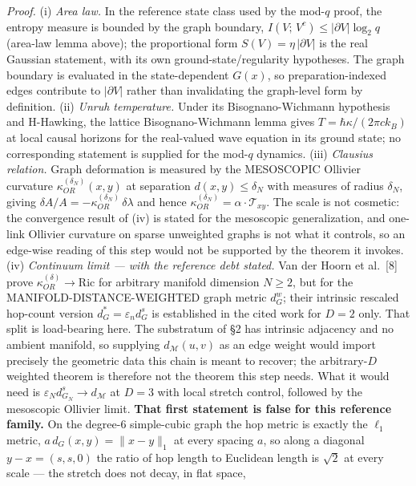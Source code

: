 \documentclass[
]{article}
\begin{document}
\emph{Proof.} (i) \emph{Area law.} In the reference state class used by
the mod-\(q\) proof, the entropy measure is bounded by the graph
boundary, \(I(V;\,V^c)\le|\partial V|\log_2 q\) (area-law lemma above);
the proportional form \(S(V)=\eta\,|\partial V|\) is the real Gaussian
statement, with its own ground-state/regularity hypotheses. The graph
boundary is evaluated in the state-dependent \(G(x)\), so
preparation-indexed edges contribute to \(|\partial V|\) rather than
invalidating the graph-level form by definition. (ii) \emph{Unruh
temperature.} Under its Bisognano-Wichmann hypothesis and H-Hawking, the
lattice Bisognano-Wichmann lemma gives \(T=\hbar\kappa/(2\pi c k_B)\) at
local causal horizons for the real-valued wave equation in its ground
state; no corresponding statement is supplied for the mod-\(q\)
dynamics. (iii) \emph{Clausius relation.} Graph deformation is measured
by the MESOSCOPIC Ollivier curvature \(\kappa^{(\delta_N)}_{OR}(x,y)\)
at separation \(d(x,y)\le\delta_N\) with measures of radius
\(\delta_N\), giving
\(\delta A/A=-\kappa^{(\delta_N)}_{OR}\,\delta\lambda\) and hence
\(\kappa^{(\delta_N)}_{OR}=\alpha\cdot\mathcal{T}_{xy}\). The scale is
not cosmetic: the convergence result of (iv) is stated for the
mesoscopic generalization, and one-link Ollivier curvature on sparse
unweighted graphs is not what it controls, so an edge-wise reading of
this step would not be supported by the theorem it invokes. (iv)
\emph{Continuum limit --- with the reference debt stated.} Van der Hoorn
et al.~{[}8{]} prove \(\kappa^{(\delta)}_{OR}\to\mathrm{Ric}\) for
arbitrary manifold dimension \(N\ge2\), but for the
MANIFOLD-DISTANCE-WEIGHTED graph metric \(d_G^w\); their intrinsic
rescaled hop-count version \(d_G^*=\varepsilon_n d_G^s\) is established
in the cited work for \(D=2\) only. That split is load-bearing here. The
substratum of §2 has intrinsic adjacency and no ambient manifold, so
supplying \(d_{\mathcal M}(u,v)\) as an edge weight would import
precisely the geometric data this chain is meant to recover; the
arbitrary-\(D\) weighted theorem is therefore not the theorem this step
needs. What it would need is
\(\varepsilon_N d^s_{G_N}\to d_{\mathcal M}\) at \(D=3\) with local
stretch control, followed by the mesoscopic Ollivier limit. \textbf{That
first statement is false for this reference family.} On the degree-\(6\)
simple-cubic graph the hop metric is exactly the \(\ell_1\) metric,
\(a\,d_G(x,y)=\|x-y\|_1\) at every spacing \(a\), so along a diagonal
\(y-x=(s,s,0)\) the ratio of hop length to Euclidean length is
\(\sqrt2\) at every scale --- the stretch does not decay, in flat space,
\end{document}
